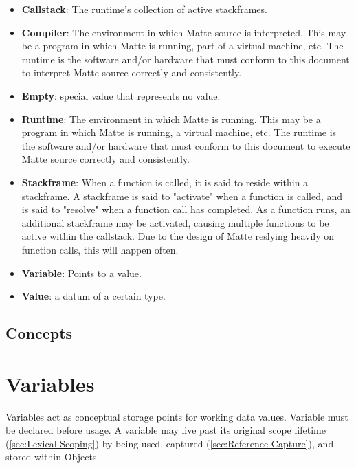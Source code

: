 \documentclass[12pt,letterpaper]{report}
\begin{document}
\begin{itemize}

\item \textbf{Callstack}: The runtime's collection of active stackframes.

\item \textbf{Compiler}: The environment in which Matte source is interpreted. This may be a program in which Matte is running, part of a virtual machine, etc. The runtime is the software and/or hardware that must conform to this document to interpret Matte source correctly and consistently.

\item \textbf{Empty}: special value that represents no value. 

\item \textbf{Runtime}: The environment in which Matte is running. This may be a program in which Matte is running, a virtual machine, etc. The runtime is the software and/or hardware that must conform to this document to execute Matte source correctly and consistently.

\item \textbf{Stackframe}: When a function is called, it is said to reside within a stackframe. A stackframe is said to "activate" when a function is called, and is said to "resolve" when a function call has completed. As a function runs, an additional stackframe may be activated, causing multiple functions to be active within the callstack. Due to the design of Matte reslying heavily on function calls, this will happen often.


\item \textbf{Variable}: Points to a value.

\item \textbf{Value}: a datum of a certain type.
\end{itemize}

\section{Concepts}
\chapter{Variables}

Variables act as conceptual storage points for working data values. Variable must be declared before usage.
A variable may live past its original scope lifetime (\autoref{sec:Lexical Scoping}) by being used, captured (\autoref{sec:Reference Capture}), and stored within Objects.
\end{document}
